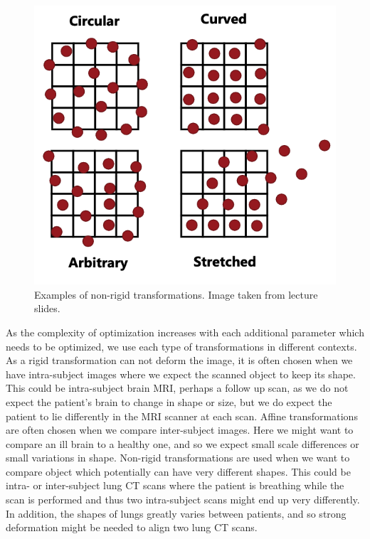 \begin{figure}[h]
	\centering
	\includegraphics[width=0.55\linewidth]{Materials/noneRigid}
	\caption{Examples of non-rigid transformations. Image taken from lecture slides.}
	\label{nonrigid}
\end{figure}
As the complexity of optimization increases with each additional parameter which needs to be optimized, we use each type of transformations in different contexts. As a rigid transformation can not deform the image, it is often chosen when we have intra-subject images where we expect the scanned object to keep its shape. This could be intra-subject brain MRI, perhaps a follow up scan, as we do not expect the patient's brain to change in shape or size, but we do expect the patient to lie differently in the MRI scanner at each scan. Affine transformations are often chosen when we compare inter-subject images. Here we might want to compare an ill brain to a healthy one, and so we expect small scale differences or small variations in shape. Non-rigid transformations are used when we want to compare object which potentially can have very different shapes. This could be intra- or inter-subject lung CT scans where the patient is breathing while the scan is performed and thus two intra-subject scans might end up very differently. In addition, the shapes of lungs greatly varies between patients, and so strong deformation might be needed to align two lung CT scans.